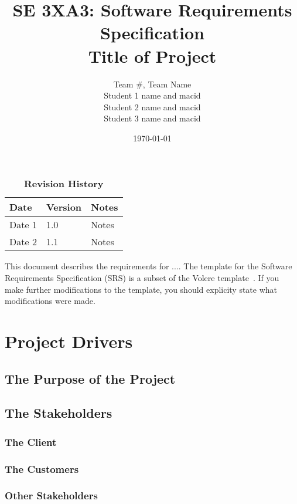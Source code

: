 \documentclass[12pt, titlepage]{article}
\title{SE 3XA3: Software Requirements Specification\\Title of Project}
\author{Team \#, Team Name
		\\ Student 1 name and macid
		\\ Student 2 name and macid
		\\ Student 3 name and macid
}
\date{\today}
\begin{document}
\maketitle

\tableofcontents
\listoftables
\listoffigures

\begin{table}[bp]
\caption{\bf Revision History}
\begin{tabularx}{\textwidth}{p{3cm}p{2cm}X}
\toprule {\bf Date} & {\bf Version} & {\bf Notes}\\
\midrule
Date 1 & 1.0 & Notes\\
Date 2 & 1.1 & Notes\\
\bottomrule
\end{tabularx}
\end{table}

\newpage


This document describes the requirements for ....  The template for the Software
Requirements Specification (SRS) is a subset of the Volere
template~\citep{RobertsonAndRobertson2012}.  If you make further modifications
to the template, you should explicity state what modifications were made.

\section{Project Drivers}

\subsection{The Purpose of the Project}

\subsection{The Stakeholders}

\subsubsection{The Client}

\subsubsection{The Customers}

\subsubsection{Other Stakeholders}
\end{document}
